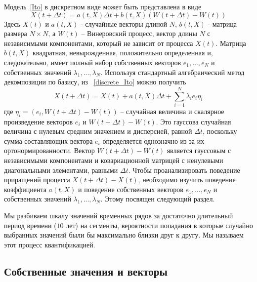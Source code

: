 Модель~\eqref{Ito} в дискретном виде может быть представлена в виде
\begin{equation}
	\label{discrete_Ito}
	X(t+\Delta t) = a(t,X) \Delta t + b(t,X) (W (t+\Delta t)-W(t))	
\end{equation}
Здесь $X(t)$ и $a(t,X)$ - случайные векторы длиной $N$, $b(t,X)$ - матрица размера $N\times N$, а $W(t)$ -- Винеровский процесс, вектор длины $N$ с независимыми компонентами, который не зависит от процесса $X(t)$. Матрица $b(t,X)$ квадратная, невырожденная, положительно определенная и, следовательно, имеет полный набор собственных векторов $e_1,...,e_N$ и собственных значений $\lambda_1,...,\lambda_N$. Используя стандартный алгебраический метод декомпозиции по базису, из ~\eqref{discrete_Ito} можно получить
\begin{equation}
	\label{decomposition}
	X(t+\Delta t) = X(t) + a(t,X) \Delta t + \sum_{i=1}^N \lambda_i e_i \eta_i
\end{equation}
где $\eta_i= (e_i,W(t+\Delta t)-W(t))$ -- случайная величина и скалярное произведение векторов $e_i$ и $W(t+\Delta t)-W(t)$. Это гауссова случайная величина с нулевым средним значением и дисперсией, равной $\Delta t$, поскольку сумма составляющих вектора $e_i$ определяется однозначно из-за их ортонормированности. Вектор $W (t + \Delta t)-W (t)$ является гауссовым с независимыми компонентами и ковариационной матрицей с ненулевыми диагональными элементами, равными $\Delta t$. Чтобы проанализировать поведение приращений процесса $X(t+\Delta t) - X(t)$, необходимо изучить поведение коэффициента $a(t,X)$ и поведение собственных векторов $e_1,...,e_N$ и собственных значений $\lambda_1,...,\lambda_N$. Этому посвящен следующий раздел.

Мы разбиваем шкалу значений временных рядов за достаточно длительный период времени ($10$ лет) на сегменты, вероятности попадания в которые случайно выбранных значений были бы максимально близки друг к другу. Мы называем этот процесс квантификацией.


\subsection{Собственные значения и векторы}
\label{algorithm}

